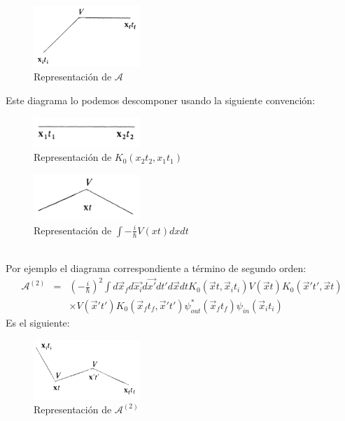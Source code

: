 \begin{figure}
\caption[Diagrama de Feynmann primera cuantización]{Representación de $\mathcal{A}$}
\includegraphics[width=4cm]{Imagenes/Fig2}
\end{figure}
Este diagrama lo podemos descomponer usando la siguiente convención:
\begin{figure}
\caption[Diagrama de Feynmann primera cuantización]{Representación de $K_0(x_2t_2,x_1t_1)$}
\includegraphics[width=4cm]{Imagenes/Fig3}
\end{figure}
\begin{figure}
\caption[Diagrama de Feynmann primera cuantización]{Representación de $\int -\frac{i}{\hbar}V(xt)dxdt$}
\includegraphics[width=4cm]{Imagenes/Fig4}
\end{figure}
\\
Por ejemplo el diagrama correspondiente a término de segundo orden:
\begin{eqnarray}
\nonumber \mathcal{A}^{(2)}&=&\left(-\frac{i}{\hbar}\right)^2\int d\vec{x}_{f}d\vec{x_{i}}d\vec{x\prime}dt\prime d\vec{x}dtK_{0}(\vec{x}t,\vec{x}_it_i)V(\vec{x}t)K_{0}(\vec{x}\prime t\prime,\vec{x}t)\\
&&\times V(\vec{x}\prime t\prime)K_{0}(\vec{x}_{f}t_{f},\vec{x}\prime t\prime)\psi_{out}^{*}(\vec{x}_{f}t_{f})\psi_{in}(\vec{x}_{i}t_{i})
\end{eqnarray}
Es el siguiente:
\begin{figure}
\caption[Diagrama de Feynmann primera cuantización]{Representación de $\mathcal{A}^{(2)}$}
\includegraphics[width=4cm]{Imagenes/Fig5}
\end{figure}
